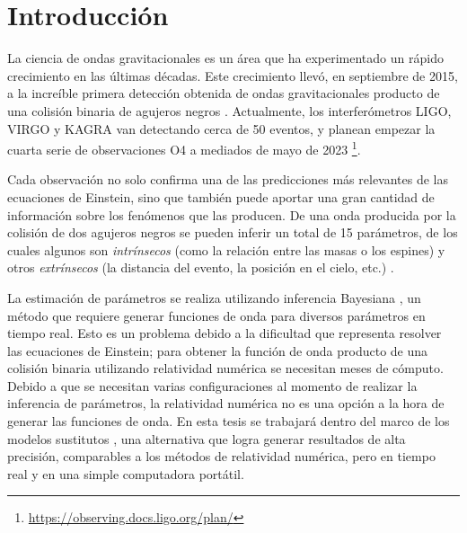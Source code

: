 \chapter{Introducción}

La ciencia de ondas gravitacionales es un área que ha experimentado un rápido crecimiento en las últimas décadas. Este crecimiento llevó, en septiembre de 2015, a la increíble primera detección obtenida de ondas gravitacionales producto de una colisión binaria de agujeros negros \cite{https://doi.org/10.48550/arxiv.1607.05251, LIGOScientific:2016aoc}. Actualmente, los interferómetros LIGO, VIRGO y KAGRA van detectando cerca de 50 eventos, y planean empezar la cuarta serie de observaciones O4 a mediados de mayo de 2023 \footnote{\url{https://observing.docs.ligo.org/plan/}}.


Cada observación no solo confirma una de las predicciones más relevantes de las ecuaciones de Einstein, sino que también puede aportar una gran cantidad de información sobre los fenómenos que las producen. De una onda producida por la colisión de dos agujeros negros se pueden inferir un total de 15 parámetros, de los cuales algunos son \textit{intrínsecos} (como la relación entre las masas o los espines) y otros \textit{extrínsecos} (la distancia del evento, la posición en el cielo, etc.) \cite{Veitch_2015}.


La estimación de parámetros se realiza utilizando inferencia Bayesiana \cite{Thrane_2019}, un método que requiere generar funciones de onda para diversos parámetros en tiempo real. Esto es un problema debido a la dificultad que representa resolver las ecuaciones de Einstein; para obtener la función de onda producto de una colisión binaria utilizando relatividad numérica se necesitan meses de cómputo. Debido a que se necesitan varias configuraciones al momento de realizar la inferencia de parámetros, la relatividad numérica no es una opción a la hora de generar las funciones de onda. En esta tesis se trabajará dentro del marco de los modelos sustitutos \cite{Field_2014}, una alternativa que logra generar resultados de alta precisión, comparables a los métodos de relatividad numérica, pero en tiempo real y en una simple computadora portátil.


